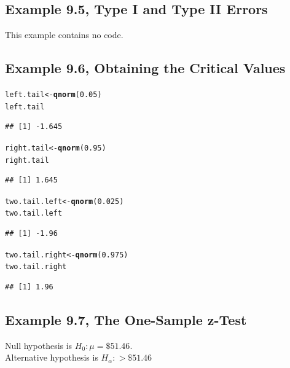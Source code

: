 \documentclass{article}\usepackage[]{graphicx}\usepackage[]{color}
\makeatletter
\newcommand{\hlnum}[1]{\textcolor[rgb]{0.686,0.059,0.569}{#1}}%
\newcommand{\hlstd}[1]{\textcolor[rgb]{0.345,0.345,0.345}{#1}}%
\newcommand{\hlkwb}[1]{\textcolor[rgb]{0.69,0.353,0.396}{#1}}%
\newcommand{\hlkwd}[1]{\textcolor[rgb]{0.737,0.353,0.396}{\textbf{#1}}}%
\newenvironment{kframe}{%
 \def\at@end@of@kframe{}%
 \ifinner\ifhmode%
  \def\at@end@of@kframe{\end{minipage}}%
  \begin{minipage}{\columnwidth}%
 \fi\fi%
 \def\FrameCommand##1{\hskip\@totalleftmargin \hskip-\fboxsep
 \colorbox{shadecolor}{##1}\hskip-\fboxsep
     \hskip-\linewidth \hskip-\@totalleftmargin \hskip\columnwidth}%
 \MakeFramed {\advance\hsize-\width
   \@totalleftmargin\z@ \linewidth\hsize
   \@setminipage}}%
 {\par\unskip\endMakeFramed%
 \at@end@of@kframe}
\newenvironment{knitrout}{}{} %
\makeatother
\begin{document}
\subsection{Example 9.5, Type I and Type II Errors}This example contains no code.
\subsection{Example 9.6, Obtaining the Critical Values}

\begin{knitrout}
\color{fgcolor}\begin{kframe}
\begin{alltt}
\hlstd{left.tail} \hlkwb{<-} \hlkwd{qnorm}\hlstd{(}\hlnum{0.05}\hlstd{)}
\hlstd{left.tail}
\end{alltt}
\begin{verbatim}
## [1] -1.645
\end{verbatim}
\begin{alltt}
\hlstd{right.tail} \hlkwb{<-} \hlkwd{qnorm}\hlstd{(}\hlnum{0.95}\hlstd{)}
\hlstd{right.tail}
\end{alltt}
\begin{verbatim}
## [1] 1.645
\end{verbatim}
\begin{alltt}
\hlstd{two.tail.left} \hlkwb{<-} \hlkwd{qnorm}\hlstd{(}\hlnum{0.025}\hlstd{)}
\hlstd{two.tail.left}
\end{alltt}
\begin{verbatim}
## [1] -1.96
\end{verbatim}
\begin{alltt}
\hlstd{two.tail.right} \hlkwb{<-} \hlkwd{qnorm}\hlstd{(}\hlnum{0.975}\hlstd{)}
\hlstd{two.tail.right}
\end{alltt}
\begin{verbatim}
## [1] 1.96
\end{verbatim}
\end{kframe}
\end{knitrout}

\subsection{Example 9.7, The One-Sample z-Test}

Null hypothesis is $H_0: \mu = \$51.46$. \\
Alternative hypothesis is $H_\alpha: > \$51.46$
\end{document}
